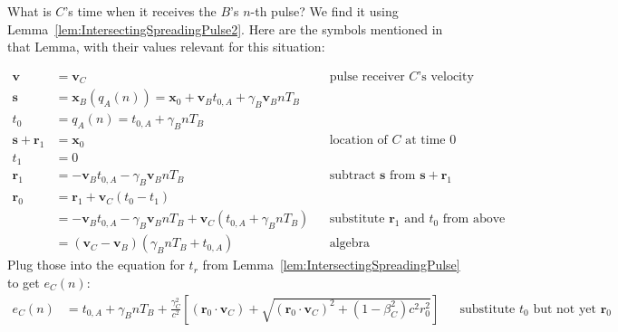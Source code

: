 \documentclass[a4paper]{article}
\theoremstyle{plain}
\theoremstyle{definition}
\newcommand{\vect}[1]{\mathbf{#1}}
\begin{document}
What is $C$'s time when it receives the $B$'s $n$-th pulse?  We find
it using Lemma~\ref{lem:IntersectingSpreadingPulse2}.  Here are the
symbols mentioned in that Lemma, with their values relevant for this
situation:

\begin{align*}
\vect{v} & = \vect{v}_C & & \text{pulse receiver $C$'s velocity} \\
\vect{s} & = \vect{x}_B(q_A(n)) = \vect{x}_0 + \vect{v}_B t_{0,A} + \gamma_B \vect{v}_B n T_B  & & \text{} \\
t_0 & = q_A(n) = t_{0,A} + \gamma_B nT_B & & \text{} \\
\vect{s} + \vect{r}_1 & = \vect{x}_0 & & \text{location of $C$ at time 0} \\
t_1 & = 0 \\
\vect{r}_1 & = - \vect{v}_B t_{0,A} - \gamma_B \vect{v}_B n T_B & & \text{subtract $\vect{s}$ from $\vect{s}+\vect{r}_1$} \\
\vect{r}_0
  & = \vect{r}_1 + \vect{v}_C(t_0-t_1) \\
  & = - \vect{v}_B t_{0,A} - \gamma_B \vect{v}_B n T_B + \vect{v}_C (t_{0,A} + \gamma_B nT_B) & & \text{substitute $\vect{r}_1$ and $t_0$ from above} \\
  & = (\vect{v}_C - \vect{v}_B) (\gamma_B n T_B + t_{0,A}) & & \text{algebra}
\end{align*}
Plug those into the equation for $t_r$ from
Lemma~\ref{lem:IntersectingSpreadingPulse} to get $e_{C}(n)$:
\begin{align*}
e_{C}(n) & = t_{0,A} + \gamma_B nT_B + \frac{\gamma_C^2}{c^2} \left[ (\vect{r}_0 \cdot \vect{v}_C) + \sqrt{(\vect{r}_0 \cdot \vect{v}_C)^2 + (1-\beta_C^2)c^2 r_0^2} \right] & & \text{substitute $t_0$ but not yet $\vect{r}_0$}
\end{align*}
\end{document}
